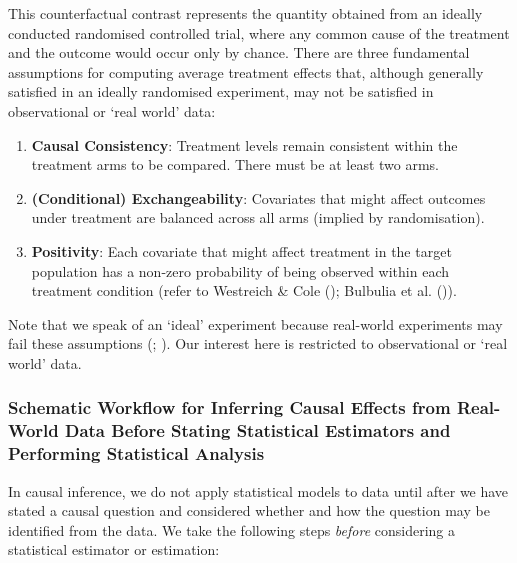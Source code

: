\documentclass[
  single column]{article}
\providecommand{\tightlist}{%
  \setlength{\itemsep}{0pt}\setlength{\parskip}{0pt}}\usepackage{longtable,booktabs,array}
\begin{document}
This counterfactual contrast represents the quantity obtained from an
ideally conducted randomised controlled trial, where any common cause of
the treatment and the outcome would occur only by chance. There are
three fundamental assumptions for computing average treatment effects
that, although generally satisfied in an ideally randomised experiment,
may not be satisfied in observational or `real world' data:

\begin{enumerate}
\def\labelenumi{\arabic{enumi}.}
\tightlist
\item
  \textbf{Causal Consistency}: Treatment levels remain consistent within
  the treatment arms to be compared. There must be at least two arms.
\item
  \textbf{(Conditional) Exchangeability}: Covariates that might affect
  outcomes under treatment are balanced across all arms (implied by
  randomisation).
\item
  \textbf{Positivity}: Each covariate that might affect treatment in the
  target population has a non-zero probability of being observed within
  each treatment condition (refer to Westreich \& Cole
  (); Bulbulia et al.
  ()).
\end{enumerate}

Note that we speak of an `ideal' experiment because real-world
experiments may fail these assumptions
(;
). Our interest here is
restricted to observational or `real world' data.

\subsubsection{Schematic Workflow for Inferring Causal Effects from
Real-World Data Before Stating Statistical Estimators and Performing
Statistical
Analysis}\label{schematic-workflow-for-inferring-causal-effects-from-real-world-data-before-stating-statistical-estimators-and-performing-statistical-analysis}

In causal inference, we do not apply statistical models to data until
after we have stated a causal question and considered whether and how
the question may be identified from the data. We take the following
steps \emph{before} considering a statistical estimator or estimation:
\end{document}

